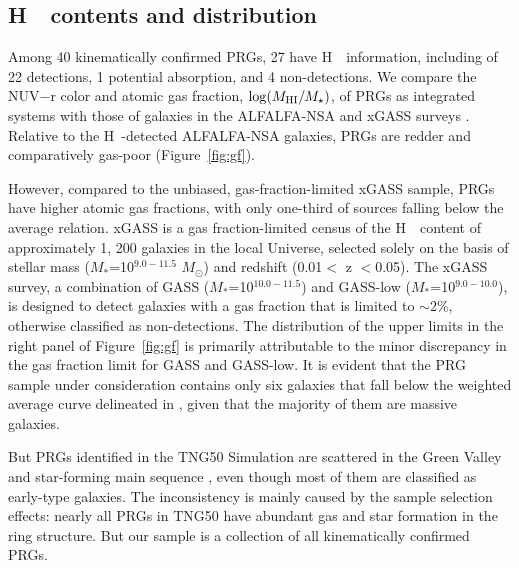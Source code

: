 \documentclass[twocolumn]{aastex631}
\newcommand{\msun}{$M_{\mathrm{\odot}}$}
\newcommand{\mstar}{$M_{*}$}
\def\HI{H\,  {\textsc{\romannumeral 1}}}
\begin{document}
\subsection{\HI\ contents and distribution}
Among 40 kinematically confirmed PRGs, 27 have \HI\ information, including of 22 detections, 1 potential absorption, and 4 non-detections. 
We compare the NUV$-$r color and atomic gas fraction, $\log(M_{\rm HI}/M_\star)$, of PRGs as integrated systems with those of galaxies in the ALFALFA-NSA and xGASS surveys \citep{Catinella2018MNRAS.476..875C}. Relative to the \HI-detected ALFALFA-NSA galaxies, PRGs are redder and comparatively gas-poor (Figure~\ref{fig:gf}). 

However, compared to the unbiased, gas-fraction-limited xGASS sample, PRGs have higher atomic gas fractions, with only one-third of sources falling below the average relation.
xGASS is a gas fraction-limited census of the \HI\ content of approximately 1,  200 galaxies in the local Universe, selected solely on the basis of stellar mass (\mstar=10$^{9.0-11.5}$ \msun) and redshift (0.01$<$ z $<$0.05). The xGASS survey, a combination of GASS (\mstar =10$^{10.0-11.5}$) and GASS-low (\mstar =10$^{9.0-10.0}$), is designed to detect galaxies with a gas fraction that is limited to $\sim$2\%, otherwise classified as non-detections. The distribution of the upper limits in the right panel of Figure~\ref{fig:gf} is primarily attributable to the minor discrepancy in the gas fraction limit for GASS and GASS-low. It is evident that the PRG sample under consideration contains only six galaxies that fall below the weighted average curve delineated in \citet{Catinella2018MNRAS.476..875C}, given that the majority of them are massive galaxies.

But PRGs identified in the TNG50 Simulation are scattered in the Green Valley and star-forming main sequence \citep{Lopez-Castillo2025MNRAS.tmp.1846L}, even though most of them are classified as early-type galaxies. The inconsistency is mainly caused by the sample selection effects: nearly all PRGs in TNG50 have abundant gas and star formation in the ring structure. But our sample is a collection of all kinematically confirmed PRGs.
\end{document}
